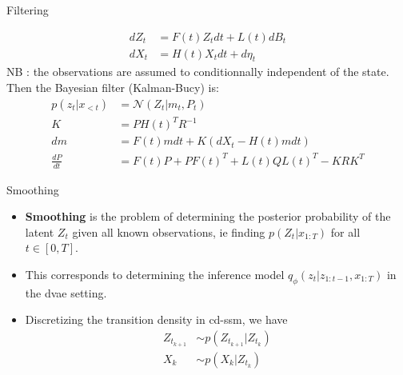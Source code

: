 \begin{frame}{Filtering}
        \begin{tcolorbox}[colback=blue!5!white,colframe=black!75!black,title=Kalman-Bucy filter]
            \begin{align}
                dZ_t &= F(t)Z_t dt + L(t) dB_t \\
                dX_t &= H(t)X_t dt + d\eta_t
            \end{align}
            NB : the observations are assumed to conditionnally independent of the state.
            Then the Bayesian filter (Kalman-Bucy) is:
            \begin{align}
                p(z_t \vert x_{<t}) &= \mathcal{N}(Z_t \vert m_t, P_t) \\
                K &= P H(t)^{T} R^{-1} \\
                dm &= F(t)m dt + K (dX_t - H(t) m dt) \\
                \frac{dP}{dt} &= F(t)P + P F(t)^{T} + L(t)QL(t)^{T} - KRK^{T}
            \end{align}
        \end{tcolorbox}
\end{frame}

\begin{frame}{Smoothing}
    \begin{itemize}
        \item \textbf{Smoothing} is the problem of determining the posterior probability of the latent $Z_t$ given 
all known observations, ie finding $p(Z_t \vert x_{1:T})$ for all $t \in [0,T]$. 
        \item This corresponds to determining the inference model $q_{\phi}(z_t \vert z_{1:t-1}, x_{1:T})$ in the \gls{dvae} setting.
        \item Discretizing the transition density in \gls{cd-ssm}, we have
            \begin{align}
                Z_{t_{k+1}} &\sim p(Z_{t_{k+1}} \vert Z_{t_k}) \\
                X_k &\sim p(X_k \vert Z_{t_k})
            \end{align}
    \end{itemize}
\end{frame}

